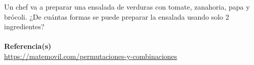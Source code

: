 Un chef va a preparar una ensalada de verduras con tomate, zanahoria, papa y brócoli. ¿De cuántas formas se puede preparar la ensalada usando solo 2 ingredientes?
\\{ }\\
\textbf{Referencia(s)}\\
\href{https://matemovil.com/permutaciones-y-combinaciones}{https://matemovil.com/permutaciones-y-combinaciones}